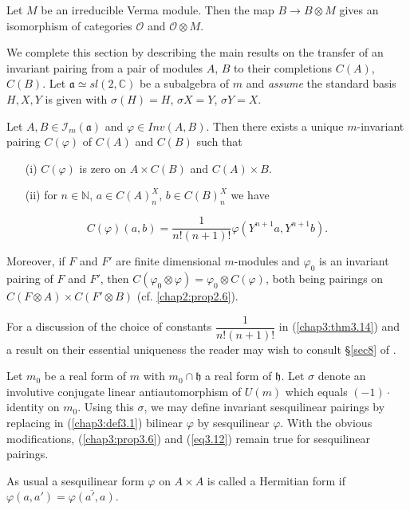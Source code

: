 \setcounter{prop}{12}
\begin{coro}\label{chap3:coro3.13}%
Let $M$ be an irreducible Verma module. Then the map $B\to B \otimes
M$ gives an isomorphism of categories $\mathscr{O}$ and $\mathscr{O}
\otimes M$.
\end{coro}

We complete this section by describing the main results on the
transfer of an invariant pairing from a pair of modules $A$, $B$ to
their completions $C(A)$, $C(B)$. Let $\mathfrak{a} \simeq sl (2,
\mathbb{C})$ be a subalgebra of $m$ and \textit{assume} the standard
basis $H,X,Y$ is given with $\sigma (H) =H$, $\sigma X = Y$, $\sigma Y
= X$. 

\begin{theorem}\label{chap3:thm3.14}
Let $A, B \in \mathscr{I}_m(\mathfrak{a})$ and $\varphi \in
Inv(A,B)$. Then there exists a unique $m$-invariant pairing
$C(\varphi)$ of $C(A)$ and $C(B)$ such that 
\begin{itemize}
\item[{\rm (i)}] $C(\varphi)$ is zero on $A \times C(B)$ and $C(A)
  \times B$.

\item[{\rm (ii)}] for $n \in \mathbb{N}$, $a \in C(A)^X_n$, $b \in
  C(B)^X_n$ we have 
\end{itemize}
$$
C(\varphi) (a,b) = \frac{1}{n! (n+1)!} \varphi(Y^{n+1} a, Y^{n+1}b).
$$\pageoriginale
\end{theorem}

Moreover, if $F$ and $F'$ are finite dimensional $m$-modules and
$\varphi_0$ is an invariant pairing of $F$ and $F'$, then $C(\varphi_0
\otimes\varphi) = \varphi_0 \otimes C(\varphi)$, both being pairings
on $C(F\otimes A) \times C(F' \otimes B)$ (cf. \ref{chap2:prop2.6}).

For a discussion of the choice of constants $\dfrac{1}{n!(n+1)!}$ in
(\ref{chap3:thm3.14}) and a result on their essential uniqueness the
reader may wish to consult \S \ref{sec8} of \cite{key15}.

\begin{remark}\label{chap3:rem3.15}
Let $m_0$ be a real form of $m$ with $m_0 \cap \mathfrak{h}$ a real
form of $\mathfrak{h}$. Let $\sigma$ denote an involutive conjugate
linear antiautomorphism of $U(m)$ which equals $(-1)\cdot$identity on
$m_0$. Using this $\sigma$, we may define invariant sesquilinear
pairings by replacing in (\ref{chap3:def3.1}) bilinear $\varphi$ by sesquilinear
$\varphi$. With the obvious modifications, (\ref{chap3:prop3.6}) and
(\ref{eq3.12}) remain 
true for sesquilinear pairings.

As usual a sesquilinear form $\varphi$ on $A \times A$ is called a
Hermitian form if $\varphi(a,a') = \overline{\varphi(a',a)}$.
\end{remark}
